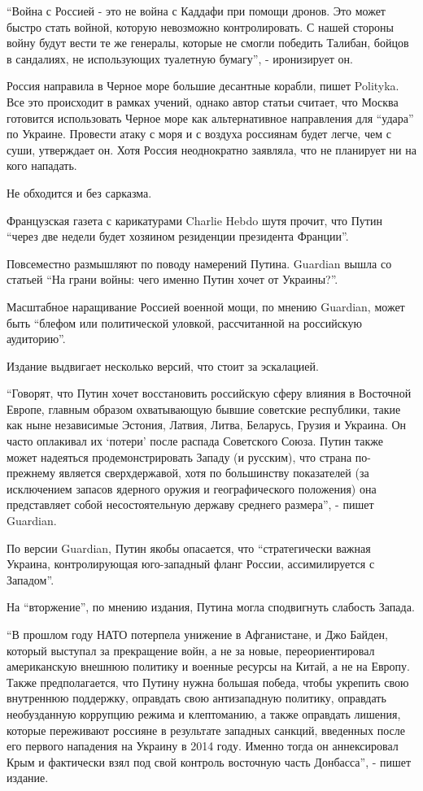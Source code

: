 \begin{multicols}{3}
\enquote{Война с Россией - это не война с Каддафи при помощи дронов. Это может
быстро стать войной, которую невозможно контролировать. С нашей стороны войну
будут вести те же генералы, которые не смогли победить Талибан, бойцов в
сандалиях, не использующих туалетную бумагу}, - иронизирует он.


Россия направила в Черное море большие десантные корабли, пишет Polityka. Все
это происходит в рамках учений, однако автор статьи считает, что Москва
готовится использовать Черное море как альтернативное направления для
\enquote{удара} по Украине. Провести атаку с моря и с воздуха россиянам будет
легче, чем с суши, утверждает он. Хотя Россия неоднократно заявляла, что не
планирует ни на кого нападать.

Не обходится и без сарказма. 

Французская газета с карикатурами Charlie Hebdo шутя прочит, что Путин
\enquote{через две недели будет хозяином резиденции президента Франции}. 

Повсеместно размышляют по поводу намерений Путина. Guardian вышла со статьей
\enquote{На грани войны: чего именно Путин хочет от Украины?}.

Масштабное наращивание Россией военной мощи, по мнению Guardian, может быть
\enquote{блефом или политической уловкой, рассчитанной на российскую аудиторию}.

Издание выдвигает несколько версий, что стоит за эскалацией.

\enquote{Говорят, что Путин хочет восстановить российскую сферу влияния в Восточной
Европе, главным образом охватывающую бывшие советские республики, такие как
ныне независимые Эстония, Латвия, Литва, Беларусь, Грузия и Украина. Он часто
оплакивал их \enquote{потери} после распада Советского Союза. Путин также может
надеяться продемонстрировать Западу (и русским), что страна по-прежнему
является сверхдержавой, хотя по большинству показателей (за исключением запасов
ядерного оружия и географического положения) она представляет собой
несостоятельную державу среднего размера}, - пишет Guardian.

По версии Guardian, Путин якобы опасается, что \enquote{стратегически важная Украина,
контролирующая юго-западный фланг России, ассимилируется с Западом}.

На \enquote{вторжение}, по мнению издания, Путина могла сподвигнуть слабость
Запада.

\enquote{В прошлом году НАТО потерпела унижение в Афганистане, и Джо Байден,
который выступал за прекращение войн, а не за новые, переориентировал
американскую внешнюю политику и военные ресурсы на Китай, а не на Европу. Также
предполагается, что Путину нужна большая победа, чтобы укрепить свою внутреннюю
поддержку, оправдать свою антизападную политику, оправдать необузданную
коррупцию режима и клептоманию, а также оправдать лишения, которые переживают
россияне в результате западных санкций, введенных после его первого нападения
на Украину в 2014 году. Именно тогда он аннексировал Крым и фактически взял под
свой контроль восточную часть Донбасса}, - пишет издание.


\end{multicols}
